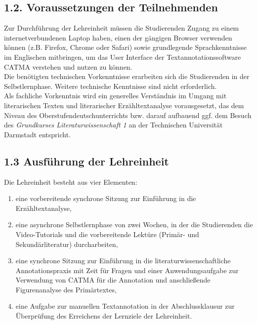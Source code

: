 \documentclass[
          a4paper,
        ]{article}
\providecommand{\tightlist}{%
  \setlength{\itemsep}{0pt}\setlength{\parskip}{0pt}}
\begin{document}
\subsection{1.2. Voraussetzungen der
Teilnehmenden}\label{voraussetzungen-der-teilnehmenden}

Zur Durchführung der Lehreinheit müssen die Studierenden Zugang zu einem
internetverbundenen Laptop haben, einen der gängigen Browser verwenden
können (z.B. Firefox, Chrome oder Safari) sowie grundlegende
Sprachkenntnisse im Englischen mitbringen, um das User Interface der
Textannotationssoftware CATMA verstehen und nutzen zu können.\\
Die benötigten technischen Vorkenntnisse erarbeiten sich die
Studierenden in der Selbstlernphase. Weitere technische Kenntnisse sind
nicht erforderlich.\\
Als fachliche Vorkenntnis wird ein generelles Verständnis im Umgang mit
literarischen Texten und literarischer Erzähltextanalyse vorausgesetzt,
das dem Niveau des Oberstufendeutschunterrichts bzw. darauf aufbauend
ggf. dem Besuch des \emph{Grundkurses Literaturwissenschaft 1} an der
Technischen Universität Darmstadt entspricht.

\subsection{1.3 Ausführung der
Lehreinheit}\label{ausfuxfchrung-der-lehreinheit}

Die Lehreinheit besteht aus vier Elementen:

\begin{enumerate}
\def\labelenumi{\arabic{enumi}.}
\tightlist
\item
  eine vorbereitende synchrone Sitzung zur Einführung in die
  Erzähltextanalyse,
\item
  eine asynchrone Selbstlernphase von zwei Wochen, in der die
  Studierenden die Video-Tutorials und die vorbereitende Lektüre
  (Primär- und Sekundärliteratur) durcharbeiten,
\item
  eine synchrone Sitzung zur Einführung in die
  literaturwissenschaftliche Annotationspraxis mit Zeit für Fragen und
  einer Anwendungsaufgabe zur Verwendung von CATMA für die Annotation
  und anschließende Figurenanalyse des Primärtextes,
\item
  eine Aufgabe zur manuellen Textannotation in der Abschlussklausur zur
  Überprüfung des Erreichens der Lernziele der Lehreinheit.
\end{enumerate}
\end{document}
